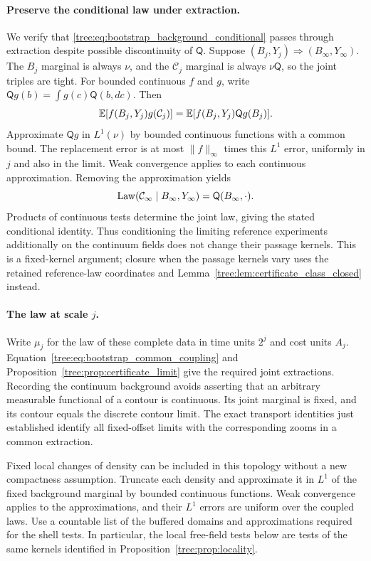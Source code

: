 \paragraph{Preserve the conditional law under extraction.}
We verify that \eqref{tree:eq:bootstrap_background_conditional}
passes through extraction despite possible discontinuity of
$\mathsf Q$.  Suppose $(B_j,Y_j)\Rightarrow(B_\infty,Y_\infty)$.
The $B_j$ marginal is always $\nu$, and the $\mathcal C_j$
marginal is always $\nu\mathsf Q$, so the joint triples are
tight.  For bounded continuous $f$ and $g$, write
$\mathsf Qg(b)=\int g(c)\mathsf Q(b,dc)$.  Then
\[
 \mathbb E[f(B_j,Y_j)g(\mathcal C_j)]
 =\mathbb E[f(B_j,Y_j)\mathsf Qg(B_j)].
\]
Approximate $\mathsf Qg$ in $L^1(\nu)$ by bounded continuous
functions with a common bound.  The replacement error is at
most $\|f\|_\infty$ times this $L^1$ error, uniformly in $j$
and also in the limit.  Weak convergence applies to each
continuous approximation.  Removing the approximation yields
\begin{equation}
 \operatorname{Law}(\mathcal C_\infty\mid B_\infty,Y_\infty)
       =\mathsf Q(B_\infty,\cdot).
 \label{tree:eq:bootstrap_background_closure}
\end{equation}
Products of continuous tests determine the joint law, giving
the stated conditional identity.  Thus conditioning the
limiting reference experiments additionally on the continuum
fields does not change their passage kernels.  This is a
fixed-kernel argument; closure when the passage kernels vary
uses the retained reference-law coordinates and
Lemma~\ref{tree:lem:certificate_class_closed} instead.

\paragraph{The law at scale $j$.}
Write $\mu_j$ for the law of these complete data in time units
$2^j$ and cost units $A_j$.  Equation~\eqref{tree:eq:bootstrap_common_coupling}
and Proposition~\ref{tree:prop:certificate_limit} give the required
joint extractions.  Recording the continuum background avoids
asserting that an arbitrary measurable functional of a contour
is continuous.  Its joint marginal is fixed, and its contour
equals the discrete contour limit.  The exact transport
identities just established identify all fixed-offset limits
with the corresponding zooms in a common extraction.

Fixed local changes of density can be included in this topology
without a new compactness assumption.  Truncate each density and
approximate it in $L^1$ of the fixed background marginal by bounded
continuous functions.  Weak convergence applies to the
approximations, and their $L^1$ errors are uniform over the
coupled laws.  Use a countable list of the buffered domains and
approximations required for the shell tests.  In particular, the
local free-field tests below are tests of the same kernels
identified in Proposition~\ref{tree:prop:locality}.


